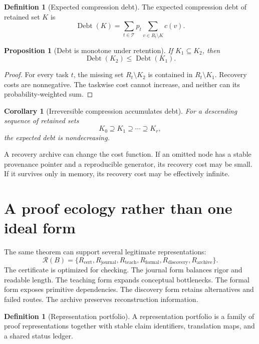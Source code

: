 \documentclass[11pt,oneside]{article}
\newtheorem{proposition}[theorem]{Proposition}
\newtheorem{corollary}[theorem]{Corollary}
\theoremstyle{definition}
\newtheorem{definition}[theorem]{Definition}
\theoremstyle{remark}
\newcommand{\Rcal}{\mathcal R}
\newcommand{\Tcal}{\mathcal T}
\newcommand{\Debt}{\operatorname{Debt}}
\begin{document}
\begin{definition}[Expected compression debt]
The expected compression debt of retained set $K$ is
\[
\Debt(K)
=
\sum_{t\in\Tcal}p_t
\sum_{v\in R_t\setminus K}c(v).
\]
\end{definition}

\begin{proposition}[Debt is monotone under retention]
If $K_1\subseteq K_2$, then
\[
\Debt(K_2)\le\Debt(K_1).
\]
\end{proposition}

\begin{proof}
For every task $t$, the missing set $R_t\setminus K_2$ is contained in $R_t\setminus K_1$. Recovery costs are nonnegative. The taskwise cost cannot increase, and neither can its probability-weighted sum.
\end{proof}

\begin{corollary}[Irreversible compression accumulates debt]
For a descending sequence of retained sets
\[
K_0\supseteq K_1\supseteq\cdots\supseteq K_r,
\]
the expected debt is nondecreasing.
\end{corollary}

A recovery archive can change the cost function. If an omitted node has a stable provenance pointer and a reproducible generator, its recovery cost may be small. If it survives only in memory, its recovery cost may be effectively infinite.

\section{A proof ecology rather than one ideal form}

The same theorem can support several legitimate representations:
\[
\Rcal(B)=
\{R_{\mathrm{cert}},R_{\mathrm{journal}},R_{\mathrm{teach}},
R_{\mathrm{formal}},R_{\mathrm{discovery}},R_{\mathrm{archive}}\}.
\]
The certificate is optimized for checking. The journal form balances rigor and readable length. The teaching form expands conceptual bottlenecks. The formal form exposes primitive dependencies. The discovery form retains alternatives and failed routes. The archive preserves reconstruction information.

\begin{definition}[Representation portfolio]
A representation portfolio is a family of proof representations together with stable claim identifiers, translation maps, and a shared status ledger.
\end{definition}
\end{document}
